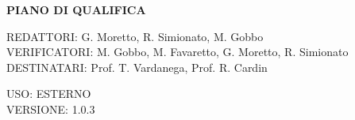 \documentclass[5pt]{article}
\begin{document}
	\vspace{24pt}
	
	\begin{center}
		\textbf{\LARGE PIANO DI QUALIFICA}
	\end{center}
	
	\vspace{13pt}
	
	\begin{flushleft}
		\begin{spacing}{1.5}
			REDATTORI: G. Moretto, R. Simionato, M. Gobbo\\%
			VERIFICATORI: M. Gobbo, M. Favaretto, G. Moretto, R. Simionato\\
			\vspace{7pt}
			DESTINATARI: Prof. T. Vardanega, Prof. R. Cardin\\%
		\end{spacing}
	\end{flushleft}
	
	\begin{flushright}
		\begin{spacing}{1}
			USO: ESTERNO\\
			VERSIONE: 1.0.3\\
		\end{spacing}
	\end{flushright}
	
	
	\restoregeometry
	
	\pagebreak
	
\end{document}
